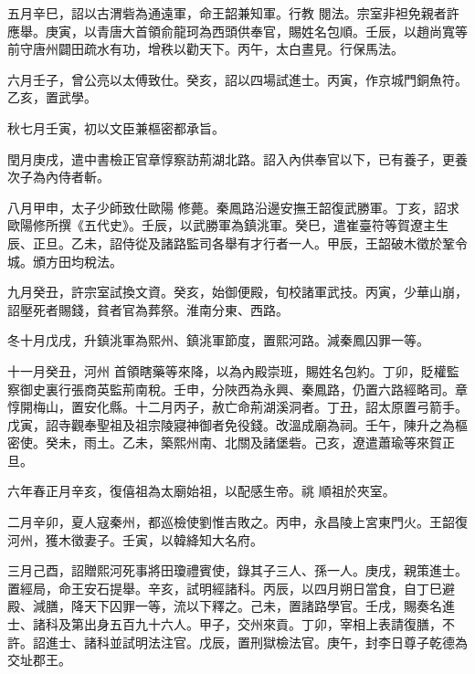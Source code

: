 \begin{pinyinscope}
 五月辛巳，詔以古渭砦為通遠軍，命王韶兼知軍。行教
 閱法。宗室非袒免親者許應舉。庚寅，以青唐大首領俞龍珂為西頭供奉官，賜姓名包順。壬辰，以趙尚寬等前守唐州闢田疏水有功，增秩以勸天下。丙午，太白晝見。行保馬法。



 六月壬子，曾公亮以太傅致仕。癸亥，詔以四場試進士。丙寅，作京城門銅魚符。乙亥，置武學。



 秋七月壬寅，初以文臣兼樞密都承旨。



 閏月庚戌，遣中書檢正官章惇察訪荊湖北路。詔入內供奉官以下，已有養子，更養次子為內侍者斬。



 八月甲申，太子少師致仕歐陽
 修薨。秦鳳路沿邊安撫王韶復武勝軍。丁亥，詔求歐陽修所撰《五代史》。壬辰，以武勝軍為鎮洮軍。癸巳，遣崔臺符等賀遼主生辰、正旦。乙未，詔侍從及諸路監司各舉有才行者一人。甲辰，王韶破木徵於鞏令城。頒方田均稅法。



 九月癸丑，許宗室試換文資。癸亥，始御便殿，旬校諸軍武技。丙寅，少華山崩，詔壓死者賜錢，貧者官為葬祭。淮南分東、西路。



 冬十月戊戌，升鎮洮軍為熙州、鎮洮軍節度，置熙河路。減秦鳳囚罪一等。



 十一月癸丑，河州
 首領瞎藥等來降，以為內殿崇班，賜姓名包約。丁卯，貶權監察御史裏行張商英監荊南稅。壬申，分陜西為永興、秦鳳路，仍置六路經略司。章惇開梅山，置安化縣。十二月丙子，赦亡命荊湖溪洞者。丁丑，詔太原置弓箭手。戊寅，詔寺觀奉聖祖及祖宗陵寢神御者免役錢。改溫成廟為祠。壬午，陳升之為樞密使。癸未，雨土。乙未，築熙州南、北關及諸堡砦。己亥，遼遣蕭瑜等來賀正旦。



 六年春正月辛亥，復僖祖為太廟始祖，以配感生帝。祧
 順祖於夾室。



 二月辛卯，夏人寇秦州，都巡檢使劉惟吉敗之。丙申，永昌陵上宮東門火。王韶復河州，獲木徵妻子。壬寅，以韓絳知大名府。



 三月己酉，詔贈熙河死事將田瓊禮賓使，錄其子三人、孫一人。庚戌，親策進士。置經局，命王安石提舉。辛亥，試明經諸科。丙辰，以四月朔日當食，自丁巳避殿、減膳，降天下囚罪一等，流以下釋之。己未，置諸路學官。壬戌，賜奏名進士、諸科及第出身五百九十六人。甲子，交州來貢。丁卯，宰相上表請復膳，不
 許。詔進士、諸科並試明法注官。戊辰，置刑獄檢法官。庚午，封李日尊子乾德為交址郡王。




\end{pinyinscope}
